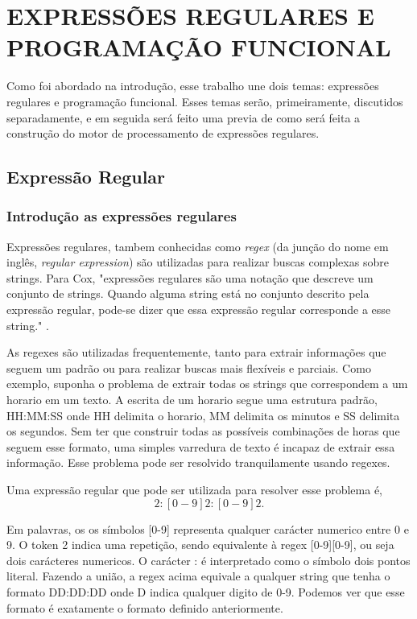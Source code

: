 \section{EXPRESSÕES REGULARES E PROGRAMAÇÃO FUNCIONAL}
Como foi abordado na introdução, esse trabalho une dois temas: expressões regulares e programação funcional.
Esses temas serão, primeiramente, discutidos separadamente, e em seguida será feito uma previa de como será feita a construção do motor de processamento de expressões regulares.

\subsection{Expressão Regular}

\subsubsection{Introdução as expressões regulares}

Expressões regulares, tambem conhecidas como \emph{regex} (da junção do nome em inglês, \emph{regular expression}) são utilizadas para realizar buscas complexas sobre strings.
Para Cox, "expressões regulares são uma notação que descreve um conjunto de strings. Quando alguma string está no conjunto descrito pela expressão regular, pode-se dizer que essa expressão regular corresponde a esse string." \cite{cox}.

As regexes são utilizadas frequentemente, tanto para extrair informações que seguem um padrão ou para realizar buscas mais flexíveis e parciais.
Como exemplo, suponha o problema de extrair todas os strings que correspondem a um horario em um texto.
A escrita de um horario segue uma estrutura padrão, HH:MM:SS onde HH delimita o horario, MM delimita os minutos e SS delimita os segundos.
Sem ter que construir todas as possíveis combinações de horas que seguem esse formato, uma simples varredura de texto é incapaz de extrair essa informação.
Esse problema pode ser resolvido tranquilamente usando regexes.

Uma expressão regular que pode ser utilizada para resolver esse problema é,
\begin{equation}
  [0-9]{2}:[0-9]{2}:[0-9]{2} .
\end{equation}

Em palavras, os os símbolos [0-9] representa qualquer carácter numerico entre 0 e 9.
O token {2} indica uma repetição, sendo equivalente à regex [0-9][0-9], ou seja dois carácteres numericos.
O carácter : é interpretado como o símbolo dois pontos literal.
Fazendo a união, a regex acima equivale a qualquer string que tenha o formato DD:DD:DD onde D indica qualquer digito de 0-9.
Podemos ver que esse formato é exatamente o formato definido anteriormente.

